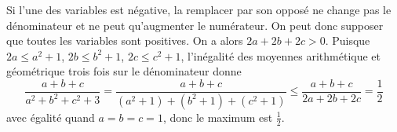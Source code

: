 Si l'une des variables est négative, la remplacer par son opposé ne change pas le dénominateur et ne peut qu'augmenter le numérateur. On peut donc supposer que toutes les variables sont positives. On a alors $2a + 2b + 2c > 0$. Puisque $2a \le a^2 + 1$, $2b \le b^2 + 1$, $2 c \le c^2 + 1$, l'inégalité des moyennes arithmétique et géométrique trois fois sur le dénominateur donne
$$\frac{a + b + c}{a^2 + b^2 + c^2 + 3} = \frac{a + b + c}{(a^2 + 1) + (b^2 + 1) + (c^2 + 1)} \le \frac{a + b + c}{2a + 2b + 2c} = \frac 12$$
avec égalité quand $a = b = c = 1$, donc le maximum est $\frac 12$.